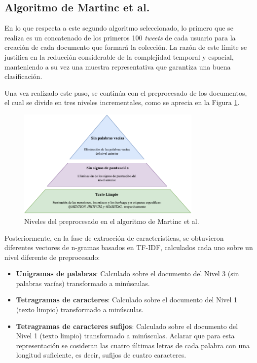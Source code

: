 \subsection{Algoritmo de Martinc et al. \cite{martinc2019hot}}

En lo que respecta a este segundo algoritmo seleccionado, lo primero que se realiza es un concatenado de los primeros 100 \textit{tweets} de cada usuario para la creación de cada documento
que formará la colección. La razón de este límite se justifica en la reducción considerable de la complejidad temporal y espacial, manteniendo a su vez una muestra representativa que garantiza
una buena clasificación.

\bigskip
Una vez realizado este paso, se continúa con el preprocesado de los documentos, el cual se divide en tres niveles incrementales, como se aprecia en la Figura \ref{fig:preprocesado_martinc}.

\bigskip
\begin{figure}[H]
	\centering
	\includegraphics[width=0.8\textwidth]{diagramas/pyramid-martinc.pdf}
	\caption{Niveles del preprocesado en el algoritmo de Martinc et al. \cite{martinc2019hot}}
	\label{fig:preprocesado_martinc}
\end{figure}

Posteriormente, en la fase de extracción de características, se obtuvieron diferentes vectores de n-gramas basados en TF-IDF, calculados cada uno sobre un nivel diferente de preprocesado:

\bigskip
\begin{itemize}
	\item \textbf{Unigramas de palabras}: Calculado sobre el documento del Nivel 3 (sin palabras vacías) transformado a minúsculas.
	\item \textbf{Tetragramas de caracteres}: Calculado sobre el documento del Nivel 1 (texto limpio) transformado a minúsculas.
	\item \textbf{Tetragramas de caracteres sufijos}: Calculado sobre el documento del Nivel 1 (texto limpio) transformado a minúsculas. Aclarar que para esta representación
	      se cosideran las cuatro últimas letras de cada palabra con una longitud suficiente, es decir, sufijos de cuatro caracteres.
\end{itemize}

